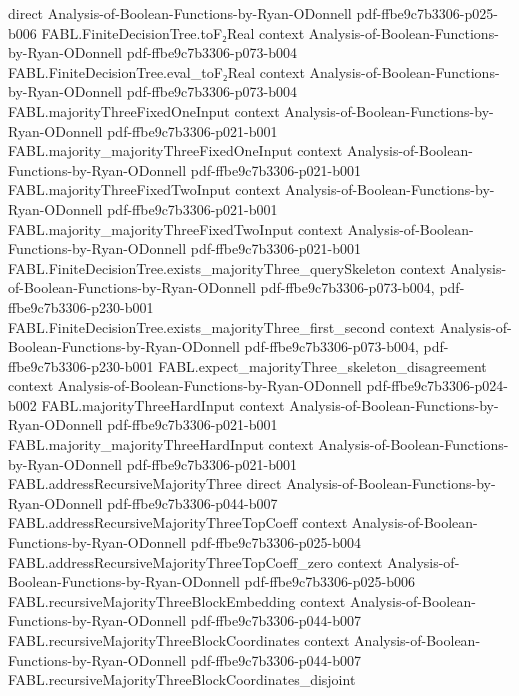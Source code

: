 \begin{theorem}
  {direct}
  {Analysis-of-Boolean-Functions-by-Ryan-ODonnell}
  {pdf-ffbe9c7b3306-p025-b006}
\proofstep
  {FABL.FiniteDecisionTree.toF₂Real}
  {context}
  {Analysis-of-Boolean-Functions-by-Ryan-ODonnell}
  {pdf-ffbe9c7b3306-p073-b004}
\proofstep
  {FABL.FiniteDecisionTree.eval_toF₂Real}
  {context}
  {Analysis-of-Boolean-Functions-by-Ryan-ODonnell}
  {pdf-ffbe9c7b3306-p073-b004}
\proofstep
  {FABL.majorityThreeFixedOneInput}
  {context}
  {Analysis-of-Boolean-Functions-by-Ryan-ODonnell}
  {pdf-ffbe9c7b3306-p021-b001}
\proofstep
  {FABL.majority_majorityThreeFixedOneInput}
  {context}
  {Analysis-of-Boolean-Functions-by-Ryan-ODonnell}
  {pdf-ffbe9c7b3306-p021-b001}
\proofstep
  {FABL.majorityThreeFixedTwoInput}
  {context}
  {Analysis-of-Boolean-Functions-by-Ryan-ODonnell}
  {pdf-ffbe9c7b3306-p021-b001}
\proofstep
  {FABL.majority_majorityThreeFixedTwoInput}
  {context}
  {Analysis-of-Boolean-Functions-by-Ryan-ODonnell}
  {pdf-ffbe9c7b3306-p021-b001}
\proofstep
  {FABL.FiniteDecisionTree.exists_majorityThree_querySkeleton}
  {context}
  {Analysis-of-Boolean-Functions-by-Ryan-ODonnell}
  {pdf-ffbe9c7b3306-p073-b004,
    pdf-ffbe9c7b3306-p230-b001}
\proofstep
  {FABL.FiniteDecisionTree.exists_majorityThree_first_second}
  {context}
  {Analysis-of-Boolean-Functions-by-Ryan-ODonnell}
  {pdf-ffbe9c7b3306-p073-b004,
    pdf-ffbe9c7b3306-p230-b001}
\proofstep
  {FABL.expect_majorityThree_skeleton_disagreement}
  {context}
  {Analysis-of-Boolean-Functions-by-Ryan-ODonnell}
  {pdf-ffbe9c7b3306-p024-b002}
\proofstep
  {FABL.majorityThreeHardInput}
  {context}
  {Analysis-of-Boolean-Functions-by-Ryan-ODonnell}
  {pdf-ffbe9c7b3306-p021-b001}
\proofstep
  {FABL.majority_majorityThreeHardInput}
  {context}
  {Analysis-of-Boolean-Functions-by-Ryan-ODonnell}
  {pdf-ffbe9c7b3306-p021-b001}
\proofstep
  {FABL.addressRecursiveMajorityThree}
  {direct}
  {Analysis-of-Boolean-Functions-by-Ryan-ODonnell}
  {pdf-ffbe9c7b3306-p044-b007}
\proofstep
  {FABL.addressRecursiveMajorityThreeTopCoeff}
  {context}
  {Analysis-of-Boolean-Functions-by-Ryan-ODonnell}
  {pdf-ffbe9c7b3306-p025-b004}
\proofstep
  {FABL.addressRecursiveMajorityThreeTopCoeff_zero}
  {context}
  {Analysis-of-Boolean-Functions-by-Ryan-ODonnell}
  {pdf-ffbe9c7b3306-p025-b006}
\proofstep
  {FABL.recursiveMajorityThreeBlockEmbedding}
  {context}
  {Analysis-of-Boolean-Functions-by-Ryan-ODonnell}
  {pdf-ffbe9c7b3306-p044-b007}
\proofstep
  {FABL.recursiveMajorityThreeBlockCoordinates}
  {context}
  {Analysis-of-Boolean-Functions-by-Ryan-ODonnell}
  {pdf-ffbe9c7b3306-p044-b007}
\proofstep
  {FABL.recursiveMajorityThreeBlockCoordinates_disjoint}

\end{theorem}
